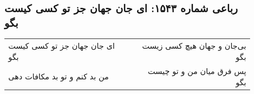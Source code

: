 \begin{center}
\section*{رباعی شماره ۱۵۴۳: ای جان جهان جز تو کسی کیست بگو}
\label{sec:1543}
\begin{longtable}{l p{0.5cm} r}
ای جان جهان جز تو کسی کیست بگو
&&
بی‌جان و جهان هیچ کسی زیست بگو
\\
من بد کنم و تو بد مکافات دهی
&&
پس فرق میان من و تو چیست بگو
\\
\end{longtable}
\end{center}
